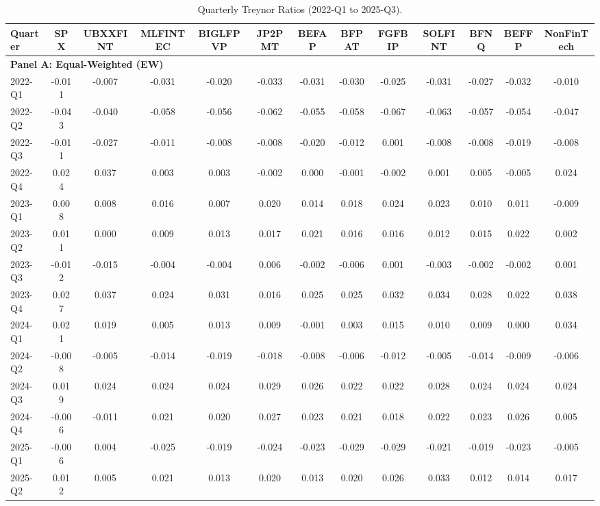 \documentclass[12pt]{article}
\begin{document}
\begin{table}[htbp]
\centering
\caption{Quarterly Treynor Ratios (2022-Q1 to 2025-Q3).}
\begin{adjustbox}{max width=\textwidth}
\begin{tabular}{lcccccccccccc}
\toprule
Quarter & SPX & UBXXFINT & MLFINTEC & BIGLFPVP & JP2PMT & BEFAP & BFPAT & FGFBIP & SOLFINT & BFNQ & BEFFP & NonFinTech \\
\midrule
\multicolumn{13}{l}{\textbf{Panel A: Equal-Weighted (EW)}} \\
\midrule
2022-Q1 & -0.011 & -0.007 & -0.031 & -0.020 & -0.033 & -0.031 & -0.030 & -0.025 & -0.031 & -0.027 & -0.032 & -0.010 \\
2022-Q2 & -0.043 & -0.040 & -0.058 & -0.056 & -0.062 & -0.055 & -0.058 & -0.067 & -0.063 & -0.057 & -0.054 & -0.047 \\
2022-Q3 & -0.011 & -0.027 & -0.011 & -0.008 & -0.008 & -0.020 & -0.012 & 0.001 & -0.008 & -0.008 & -0.019 & -0.008 \\
2022-Q4 & 0.024 & 0.037 & 0.003 & 0.003 & -0.002 & 0.000 & -0.001 & -0.002 & 0.001 & 0.005 & -0.005 & 0.024 \\
2023-Q1 & 0.008 & 0.008 & 0.016 & 0.007 & 0.020 & 0.014 & 0.018 & 0.024 & 0.023 & 0.010 & 0.011 & -0.009 \\
2023-Q2 & 0.011 & 0.000 & 0.009 & 0.013 & 0.017 & 0.021 & 0.016 & 0.016 & 0.012 & 0.015 & 0.022 & 0.002 \\
2023-Q3 & -0.012 & -0.015 & -0.004 & -0.004 & 0.006 & -0.002 & -0.006 & 0.001 & -0.003 & -0.002 & -0.002 & 0.001 \\
2023-Q4 & 0.027 & 0.037 & 0.024 & 0.031 & 0.016 & 0.025 & 0.025 & 0.032 & 0.034 & 0.028 & 0.022 & 0.038 \\
2024-Q1 & 0.021 & 0.019 & 0.005 & 0.013 & 0.009 & -0.001 & 0.003 & 0.015 & 0.010 & 0.009 & 0.000 & 0.034 \\
2024-Q2 & -0.008 & -0.005 & -0.014 & -0.019 & -0.018 & -0.008 & -0.006 & -0.012 & -0.005 & -0.014 & -0.009 & -0.006 \\
2024-Q3 & 0.019 & 0.024 & 0.024 & 0.024 & 0.029 & 0.026 & 0.022 & 0.022 & 0.028 & 0.024 & 0.024 & 0.024 \\
2024-Q4 & -0.006 & -0.011 & 0.021 & 0.020 & 0.027 & 0.023 & 0.021 & 0.018 & 0.022 & 0.023 & 0.026 & 0.005 \\
2025-Q1 & -0.006 & 0.004 & -0.025 & -0.019 & -0.024 & -0.023 & -0.029 & -0.029 & -0.021 & -0.019 & -0.023 & -0.005 \\
2025-Q2 & 0.012 & 0.005 & 0.021 & 0.013 & 0.020 & 0.013 & 0.020 & 0.026 & 0.033 & 0.012 & 0.014 & 0.017 \\

\end{tabular}
\end{adjustbox}
\end{table}
\end{document}

